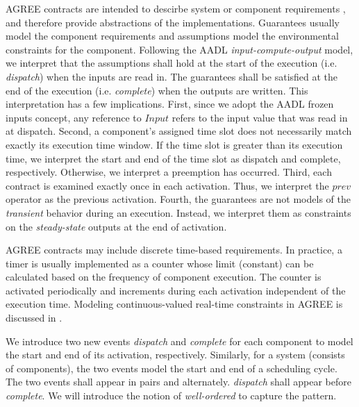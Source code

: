 AGREE contracts are intended to descirbe system or component requirements \cite{AGREE2}, and therefore provide abstractions of the implementations. Guarantees usually model the component requirements and assumptions model the environmental constraints for the component. Following the AADL \emph{input-compute-output} model, we interpret that the assumptions shall hold at the start of the execution (i.e. \emph{dispatch}) when the inputs are read in. The guarantees shall be satisfied at the end of the execution (i.e. \emph{complete}) when the outputs are written. This interpretation has a few implications. 
First, since we adopt the AADL frozen inputs concept, any reference to $Input$ refers to the input value that was read in at dispatch.
Second, a component's assigned time slot does not necessarily match exactly its execution time window. If the time slot is greater than its execution time, we interpret the start and end of the time slot as dispatch and complete, respectively. Otherwise, we interpret a preemption has occurred.
Third, each contract is examined exactly once in each activation. Thus, we interpret the $prev$ operator as the previous activation. 
Fourth, the guarantees are not models of the \emph{transient} behavior during an execution. Instead, we interpret them as constraints on the \emph{steady-state} outputs at the end of activation.

AGREE contracts may include discrete time-based requirements. In practice, a timer is usually implemented as a counter whose limit (constant) can be calculated based on the frequency of component execution. The counter is activated periodically and increments during each activation independent of the execution time. 
Modeling continuous-valued real-time constraints in AGREE is discussed in \cite{rtAGREE}.

We introduce two new events \emph{dispatch} and \emph{complete} for each component to model the start and end of its activation, respectively. 
Similarly, for a system (consists of components), the two events model the start and end of a scheduling cycle. 
The two events shall appear in pairs and alternately. \emph{dispatch} shall appear before \emph{complete}. We will introduce the notion of \emph{well-ordered} to capture the pattern.

